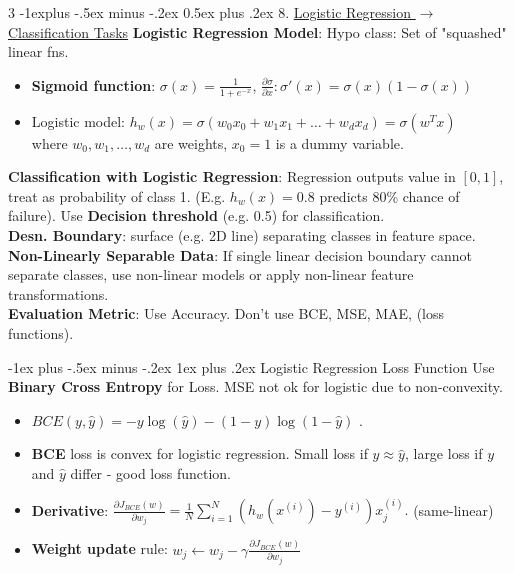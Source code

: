 \documentclass[a4paper, 9pt, landscape]{article}
\makeatletter
\renewcommand{\subsection}{\@startsection{subsection}{2}{0mm}%
                                {-1explus -.5ex minus -.2ex}%
                                {0.5ex plus .2ex}%
                                {\normalfont\normalsize\bfseries}}
\renewcommand{\subsubsection}{\@startsection{subsubsection}{3}{0mm}%
                                {-1ex plus -.5ex minus -.2ex}%
                                {1ex plus .2ex}%
                                {\normalfont\small\bfseries}}
\makeatother
\begin{document}
\begin{multicols*}{3}
\subsection{8. \underline{Logistic Regression  $\rightarrow$ Classification Tasks}}
\textbf{Logistic Regression Model}: Hypo class: Set of "squashed" linear fns. 
\begin{itemize}[itemsep=-2pt]
    \item \textbf{Sigmoid function}: $\sigma(x) = \frac{1}{1 + e^{-x}}$, \quad $\frac{\partial \sigma}{\partial x}: \sigma'(x) = \sigma(x)(1 - \sigma(x))$
    \item Logistic model: $h_w(x) = \sigma(w_0x_0 + w_1x_1 + \dots + w_dx_d) = \sigma(w^T x)$ \\
    where $ w_0, w_1, \dots, w_d $ are weights, $ x_0 = 1 $ is a dummy variable.
\end{itemize}
\textbf{Classification with Logistic Regression}: Regression outputs value in $ [0, 1] $, treat as probability of class 1. (E.g. $ h_w(x) = 0.8 $ predicts 80\% chance of failure). Use \textbf{Decision threshold} (e.g. 0.5) for classification.  \\
\textbf{Desn. Boundary}: surface (e.g. 2D line) separating classes in feature space.\\
\textbf{Non-Linearly Separable Data}: If single linear decision boundary cannot separate classes, use non-linear models or apply non-linear feature transformations. \\
\textbf{Evaluation Metric}: Use Accuracy. Don't use BCE, MSE, MAE, (loss functions).

\subsubsection{Logistic Regression Loss Function}
Use \textbf{Binary Cross Entropy} for Loss. MSE not ok for logistic due to non-convexity.
\begin{itemize}[itemsep=-2pt]
    \item $BCE(y, \hat{y}) = -y \log(\hat{y}) - (1 - y) \log(1 - \hat{y})$ .
    \item \textbf{BCE} loss is convex for logistic regression. Small loss if $ y \approx \hat{y} $, large loss if $ y $ and $ \hat{y} $ differ - good loss function. 
    \item \textbf{Derivative}: $\frac{\partial J_{BCE}(w)}{\partial w_j} = \frac{1}{N} \sum_{i=1}^N (h_w(x^{(i)}) - y^{(i)}) x_j^{(i)}. $ (same-linear)
    \item \textbf{Weight update} rule: $w_j \leftarrow w_j - \gamma \frac{\partial J_{BCE}(w)}{\partial w_j} $
\end{itemize}


\end{multicols*}
\end{document}
